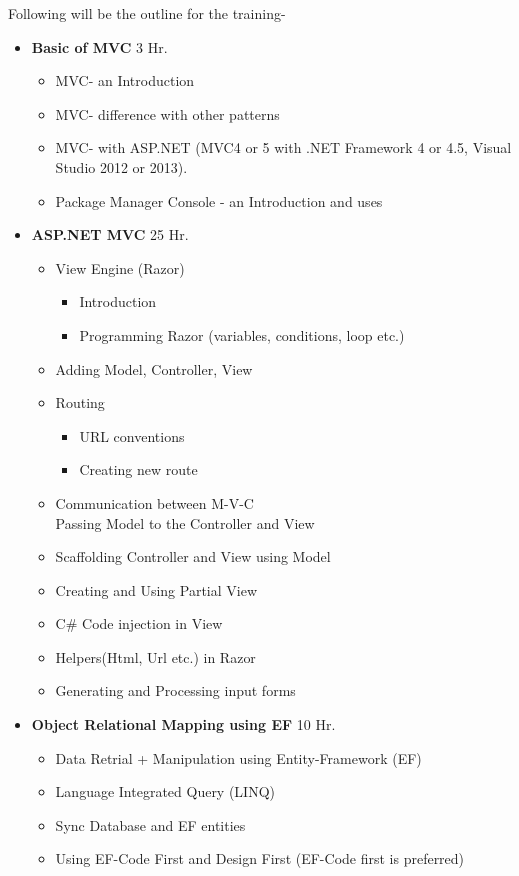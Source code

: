 \documentclass[12pt,a4paper]{article}
\begin{document}
Following will be the outline for the training-
\begin{itemize} 
    \item \textbf{Basic of MVC} \hfill 3 Hr.    
    \begin{itemize}
        \item MVC- an Introduction
        \item MVC- difference with other patterns
        \item MVC- with ASP.NET (MVC4 or 5 with .NET Framework
                    4 or 4.5, Visual Studio 2012 or 2013).
        \item Package Manager Console - an Introduction and uses 
    \end{itemize} 

    \item \textbf{ASP.NET MVC} \hfill 25 Hr.
    \begin{itemize}
        \item View Engine (Razor)
            \begin{itemize}
                \item Introduction
                \item Programming Razor 
                        (variables, conditions, loop etc.)                
            \end{itemize}
        \item Adding Model, Controller, View
        \item Routing
            \begin{itemize}
                \item URL conventions
                \item Creating new route
            \end{itemize}
        \item Communication between M-V-C \\
        Passing Model to the Controller and View
        \item Scaffolding Controller and View using Model
        \item Creating and Using Partial View
        \item C\# Code injection in View
        \item Helpers(Html, Url etc.) in Razor
        \item Generating and Processing input forms
    \end{itemize}
    \item \textbf{Object Relational Mapping using EF} \hfill 10 Hr.
    \begin{itemize}        
        \item Data Retrial + Manipulation using Entity-Framework (EF)
        \item Language Integrated Query (LINQ)
        \item Sync Database and EF entities
        \item Using EF-Code First and Design First 
                (EF-Code first is preferred)
         

\end{itemize}
\end{itemize}
\end{document}

